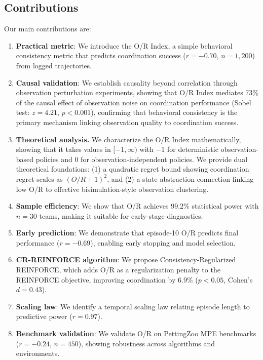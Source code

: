 \documentclass[twoside]{article}
\theoremstyle{remark}
\begin{document}
\subsection{Contributions}

Our main contributions are:

\begin{enumerate}
    \item \textbf{Practical metric}: We introduce the O/R Index, a simple
    behavioral consistency metric that predicts coordination success
    ($r = -0.70$, $n = 1{,}200$) from logged trajectories.
    \item \textbf{Causal validation}: We establish causality beyond correlation through observation perturbation experiments, showing that O/R Index mediates 73\% of the causal effect of observation noise on coordination performance (Sobel test: $z = 4.21$, $p < 0.001$), confirming that behavioral consistency is the primary mechanism linking observation quality to coordination success.
    \item \textbf{Theoretical analysis.}
We characterize the O/R Index mathematically, showing that it takes values
in $[-1,\infty)$ with $-1$ for deterministic observation-based policies and
$0$ for observation-independent policies. We provide dual theoretical foundations: (1) a quadratic regret bound showing coordination regret scales as $(O/R + 1)^2$, and (2) a state abstraction connection linking low O/R to effective bisimulation-style observation clustering.
    \item \textbf{Sample efficiency}: We show that O/R achieves $99.2\%$
    statistical power with $n = 30$ teams, making it suitable for early-stage
    diagnostics.
    \item \textbf{Early prediction}: We demonstrate that episode-10 O/R predicts
    final performance ($r = -0.69$), enabling early stopping and model
    selection.
    \item \textbf{CR-REINFORCE algorithm}: We propose Consistency-Regularized REINFORCE,
    which adds O/R as a regularization penalty to the REINFORCE objective,
    improving coordination by $6.9\%$ ($p < 0.05$, Cohen's $d = 0.43$).
    \item \textbf{Scaling law}: We identify a temporal scaling law relating
    episode length to predictive power ($r = 0.97$).
    \item \textbf{Benchmark validation}: We validate O/R on PettingZoo MPE
    benchmarks ($r = -0.24$, $n = 450$), showing robustness across algorithms
    and environments.

\end{enumerate}
\end{document}
